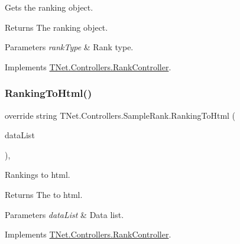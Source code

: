 Gets the ranking object. 

\begin{DoxyReturn}{Returns}
The ranking object.
\end{DoxyReturn}

\begin{DoxyParams}{Parameters}
{\em rank\+Type} & Rank type.\\
\hline
\end{DoxyParams}


Implements \mbox{\hyperlink{class_t_net_1_1_controllers_1_1_rank_controller_aec1afa4c5dedbebd41a32416f4f827b1}{T\+Net.\+Controllers.\+Rank\+Controller}}.

\mbox{\label{class_t_net_1_1_controllers_1_1_sample_rank_ae2de6cc2ed3dcdcd29f6df49c406da07}} 
\subsubsection{\texorpdfstring{Ranking\+To\+Html()}{RankingToHtml()}}
{\footnotesize\ttfamily override string T\+Net.\+Controllers.\+Sample\+Rank.\+Ranking\+To\+Html (\begin{DoxyParamCaption}\item[{I\+List$<$ object $>$}]{data\+List }\end{DoxyParamCaption})\hspace{0.3cm}{\ttfamily [protected]}, {\ttfamily [virtual]}}



Rankings to html. 

\begin{DoxyReturn}{Returns}
The to html.
\end{DoxyReturn}

\begin{DoxyParams}{Parameters}
{\em data\+List} & Data list.\\
\hline
\end{DoxyParams}


Implements \mbox{\hyperlink{class_t_net_1_1_controllers_1_1_rank_controller_a453b81a53f72a30914f32ecded63dae2}{T\+Net.\+Controllers.\+Rank\+Controller}}.

\mbox{\label{class_t_net_1_1_controllers_1_1_sample_rank_ae6bc5f73a0068ef27537e742cbff29be}} 

